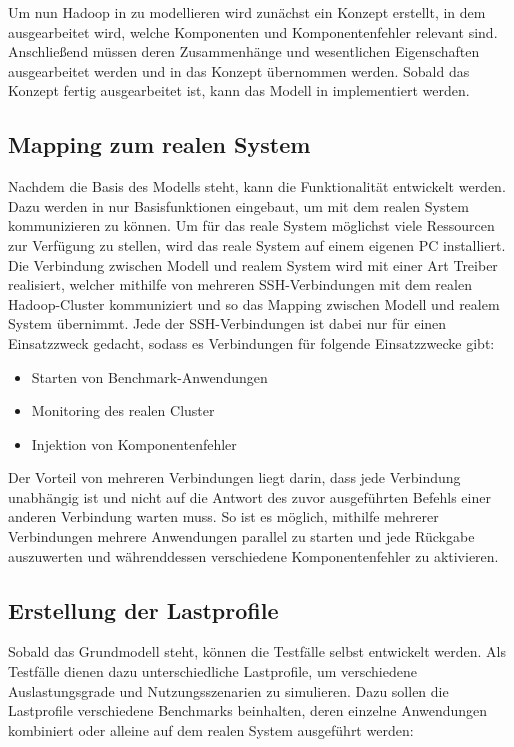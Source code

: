 Um nun Hadoop in \sS zu modellieren wird zunächst ein Konzept erstellt, in dem ausgearbeitet wird, welche Komponenten und Komponentenfehler relevant sind. Anschließend müssen deren Zusammenhänge und wesentlichen Eigenschaften ausgearbeitet werden und in das Konzept übernommen werden. Sobald das Konzept fertig ausgearbeitet ist, kann das Modell in \sS implementiert werden.

\subsection{Mapping zum realen System}\label{sec:mapping}

Nachdem die Basis des Modells steht, kann die Funktionalität entwickelt werden. Dazu werden in \sS nur Basisfunktionen eingebaut, um mit dem realen System kommunizieren zu können. Um für das reale System möglichst viele Ressourcen zur Verfügung zu stellen, wird das reale System auf einem eigenen PC installiert. Die Verbindung zwischen Modell und realem System wird mit einer Art Treiber realisiert, welcher mithilfe von mehreren SSH-Verbindungen mit dem realen Hadoop-Cluster kommuniziert und so das Mapping zwischen Modell und realem System übernimmt. Jede der SSH-Verbindungen ist dabei nur für einen Einsatzzweck gedacht, sodass es Verbindungen für \uA folgende Einsatzzwecke gibt:

\begin{itemize}[noitemsep]
	\item Starten von Benchmark-Anwendungen
	\item Monitoring des realen Cluster
	\item Injektion von Komponentenfehler
\end{itemize}

Der Vorteil von mehreren Verbindungen liegt darin, dass jede Verbindung unabhängig ist und nicht auf die Antwort des zuvor ausgeführten Befehls einer anderen Verbindung warten muss. So ist es möglich, mithilfe mehrerer Verbindungen mehrere Anwendungen parallel zu starten und jede Rückgabe auszuwerten und währenddessen verschiedene Komponentenfehler zu aktivieren.

\subsection{Erstellung der Lastprofile}\label{sec:lastprofilerstellung}

Sobald das Grundmodell steht, können die Testfälle selbst entwickelt werden. Als Testfälle dienen dazu unterschiedliche Lastprofile, um verschiedene Auslastungsgrade und Nutzungsszenarien zu simulieren. Dazu sollen die Lastprofile verschiedene Benchmarks beinhalten, deren einzelne Anwendungen kombiniert oder alleine auf dem realen System ausgeführt werden:

